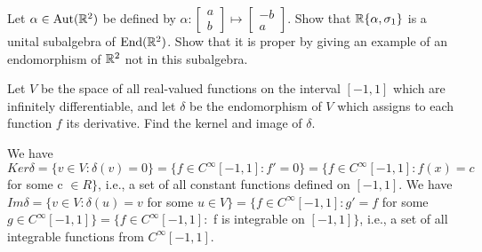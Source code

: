 \begin{solution}
\begin{enumerate}
\end{enumerate}

\end{solution}

\probskip

\begin{problem}[Golan 325]
Let $\alpha \in \operatorname{Aut}(\mathbb{R}^2)$ be defined by 
$\alpha: 
\begin{bmatrix} a\\ b \end{bmatrix} 
\mapsto 
\begin{bmatrix} -b\\ a \end{bmatrix}$.
Show that $\mathbb{R}\{\alpha, \sigma_1\}$ is a unital subalgebra of $\operatorname{End}(\mathbb{R}^2)$.  Show
that it is proper by giving an example of an endomorphism of $\mathbb{R}^2$ not in this
subalgebra. 
\end{problem}

\probskip

\begin{problem}[Golan 326]
Let $V$ be the space of all real-valued functions on the interval $[-1, 1]$
which are infinitely differentiable, and let $\delta$ be the endomorphism of $V$
which assigns to each function $f$ its derivative.  Find the kernel and image of
$\delta$. 
\end{problem}
\smallskip
\begin{solution}

We have $Ker\delta=\{v \in V : \delta(v)=0 \} = \{f \in C^{\infty}[-1,1] : f'=0 \} = 
\{f \in C^{\infty}[-1,1] : f(x) = c$ for some c $\in R\}$, i.e., a set of all constant 
functions defined on $[-1,1]$.
\smallskip
We have $Im\delta=\{v \in V : \delta(u)=v$ for some $u \in V \} = 
\{f \in C^{\infty}[-1,1] : g'=f$ for some $g \in C^{\infty}[-1,1] \} = 
\{f \in C^{\infty}[-1,1] : $ f is integrable on $[-1,1] \}$, i.e., a set of all 
integrable functions from $C^{\infty}[-1,1]$.

\end{solution}

\probskip

